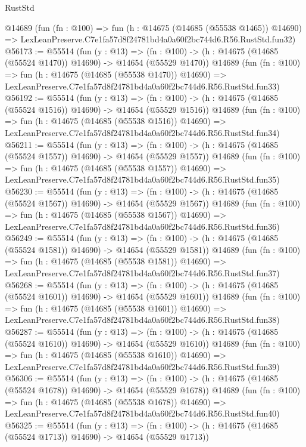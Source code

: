 \begin{lexlean}{RustStd}
\begin{coremodule}
    @14689
    (fun (fn : @100) =>
    fun (h : @14675 (@14685 (@55538 @1465)) @14690) =>
    LexLeanPreserve.C7e1fa57d8f24781bd4a0a60f2bc744d6.R56.RustStd.fun32)
@56173 := @55514
    (fun (y : @13) =>
    (fn : @100) -> (h : @14675 (@14685 (@55524 @1470)) @14690) -> @14654 (@55529 @1470))
    @14689
    (fun (fn : @100) =>
    fun (h : @14675 (@14685 (@55538 @1470)) @14690) =>
    LexLeanPreserve.C7e1fa57d8f24781bd4a0a60f2bc744d6.R56.RustStd.fun33)
@56192 := @55514
    (fun (y : @13) =>
    (fn : @100) -> (h : @14675 (@14685 (@55524 @1516)) @14690) -> @14654 (@55529 @1516))
    @14689
    (fun (fn : @100) =>
    fun (h : @14675 (@14685 (@55538 @1516)) @14690) =>
    LexLeanPreserve.C7e1fa57d8f24781bd4a0a60f2bc744d6.R56.RustStd.fun34)
@56211 := @55514
    (fun (y : @13) =>
    (fn : @100) -> (h : @14675 (@14685 (@55524 @1557)) @14690) -> @14654 (@55529 @1557))
    @14689
    (fun (fn : @100) =>
    fun (h : @14675 (@14685 (@55538 @1557)) @14690) =>
    LexLeanPreserve.C7e1fa57d8f24781bd4a0a60f2bc744d6.R56.RustStd.fun35)
@56230 := @55514
    (fun (y : @13) =>
    (fn : @100) -> (h : @14675 (@14685 (@55524 @1567)) @14690) -> @14654 (@55529 @1567))
    @14689
    (fun (fn : @100) =>
    fun (h : @14675 (@14685 (@55538 @1567)) @14690) =>
    LexLeanPreserve.C7e1fa57d8f24781bd4a0a60f2bc744d6.R56.RustStd.fun36)
@56249 := @55514
    (fun (y : @13) =>
    (fn : @100) -> (h : @14675 (@14685 (@55524 @1581)) @14690) -> @14654 (@55529 @1581))
    @14689
    (fun (fn : @100) =>
    fun (h : @14675 (@14685 (@55538 @1581)) @14690) =>
    LexLeanPreserve.C7e1fa57d8f24781bd4a0a60f2bc744d6.R56.RustStd.fun37)
@56268 := @55514
    (fun (y : @13) =>
    (fn : @100) -> (h : @14675 (@14685 (@55524 @1601)) @14690) -> @14654 (@55529 @1601))
    @14689
    (fun (fn : @100) =>
    fun (h : @14675 (@14685 (@55538 @1601)) @14690) =>
    LexLeanPreserve.C7e1fa57d8f24781bd4a0a60f2bc744d6.R56.RustStd.fun38)
@56287 := @55514
    (fun (y : @13) =>
    (fn : @100) -> (h : @14675 (@14685 (@55524 @1610)) @14690) -> @14654 (@55529 @1610))
    @14689
    (fun (fn : @100) =>
    fun (h : @14675 (@14685 (@55538 @1610)) @14690) =>
    LexLeanPreserve.C7e1fa57d8f24781bd4a0a60f2bc744d6.R56.RustStd.fun39)
@56306 := @55514
    (fun (y : @13) =>
    (fn : @100) -> (h : @14675 (@14685 (@55524 @1678)) @14690) -> @14654 (@55529 @1678))
    @14689
    (fun (fn : @100) =>
    fun (h : @14675 (@14685 (@55538 @1678)) @14690) =>
    LexLeanPreserve.C7e1fa57d8f24781bd4a0a60f2bc744d6.R56.RustStd.fun40)
@56325 := @55514
    (fun (y : @13) =>
    (fn : @100) -> (h : @14675 (@14685 (@55524 @1713)) @14690) -> @14654 (@55529 @1713))

\end{coremodule}
\end{lexlean}
